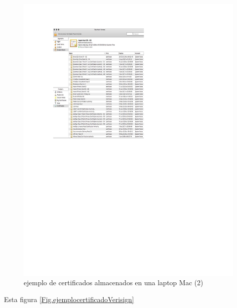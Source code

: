 \documentclass[12pt]{report} %
\begin{document}
\begin{itemize}
\begin{figure}
\centering
\includegraphics[width=0.85\columnwidth]{imagenes/otroejcertalmacenadoenlaptop.pdf}
\caption{ejemplo de certificados almacenados en una laptop Mac (2)}
\label{Fig.ejemploclmacenamientodecertificadodefirma}
\end{figure} 

Esta figura \ref{Fig.ejemplocertificadoVerisign}


\end{itemize}
\end{document}
